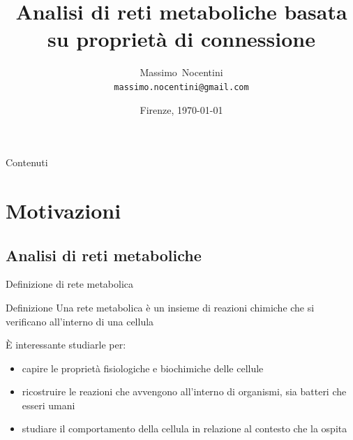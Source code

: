 \documentclass{beamer}
\title[Analisi di reti metaboliche] {Analisi di reti metaboliche
  basata su propriet\`a di connessione}
\author[Massimo Nocentini] %
{Massimo~Nocentini\\\texttt{massimo.nocentini@gmail.com}}
\institute[UniversitaStudiFirenze] %
 { Universit\`a degli Studi di Firenze }
\date[Tesi20120222] %
{Firenze, \today}
\begin{document}
\begin{frame}[plain]
  \titlepage
\end{frame}

\begin{frame}{Contenuti}
  \tableofcontents[pausesections]
\end{frame}





\section{Motivazioni}

\subsection{Analisi di reti metaboliche}

\begin{frame}{Definizione di rete metabolica}
  \begin{block}{Definizione}
    Una rete metabolica \`e un insieme di reazioni chimiche che si
    verificano all'interno di una cellula
  \end{block}
  \`E interessante studiarle per:
  \begin{itemize}
  \item capire le propriet\`a fisiologiche e biochimiche delle
    cellule
  \item ricostruire le reazioni che avvengono all'interno di
    organismi, sia batteri che esseri umani
  \item studiare il comportamento della cellula in relazione al
    contesto che la ospita
  \end{itemize}
\end{frame}
\end{document}
